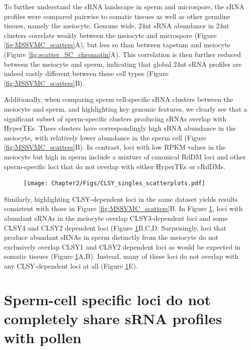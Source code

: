 To further understand the sRNA landscape in sperm and microspore, the sRNA profiles were compared pairwise to somatic tissues as well as other germline tissues, namely the meiocyte. Genome wide, 24nt sRNA abundance in 24nt clusters correlate weakly between the meiocyte and microspore (Figure \ref{fig:MSSVMC_scatters}A), but less so than between tapetum and meiocyte (Figure \ref{fig:scatter_SC_chromatin}A). This correlation is then further reduced between the meiocyte and sperm, indicating that global 24nt sRNA profiles are indeed vastly different between these cell types (Figure \ref{fig:MSSVMC_scatters}B).

Additionally, when comparing sperm cell-specific sRNA clusters between the meiocyte and sperm, and highlighting key genomic features, we clearly see that a significant subset of sperm-specific clusters producing sRNAs overlap with HyperTEs. These clusters have correspondingly high sRNA abundance in the meiocyte, with relatively lower abundance in the sperm cell (Figure \ref{fig:MSSVMC_scatters}B). In contrast, loci with low RPKM values in the meiocyte but high in sperm include a mixture of canonical RdDM loci and other sperm-specific loci that do not overlap with either HyperTEs or cRdDMs.

\begin{figure}[htbp!] 
\centering    
    \texttt{[image: Chapter2/Figs/CLSY\_singles\_scatterplots.pdf]}
\caption{\textbf{}}
\label{fig:clsysingle_scatters}
\captionsetup{font=small}
    \caption*{}
\end{figure}

Similarly, highlighting CLSY-dependent loci in the same dataset  yields results consistent with those in Figure \ref{fig:MSSVMC_scatters}B. In Figure \ref{fig:clsysingle_scatters}, loci with abundant sRNAs in the meiocyte overlap CLSY3-dependent loci and some CLSY4 and CLSY2 dependent loci (Figure \ref{fig:clsysingle_scatters}B,C,D. Surprisingly, loci that produce abundant sRNAs in sperm distinctly from the meiocyte do not exclusively overlap CLSY1 and CLSY2 dependent loci as would be expected in somatic tissues (Figure \ref{fig:clsysingle_scatters}A,B). Instead, many of these loci do not overlap with any CLSY-dependent loci at all (Figure \ref{fig:clsysingle_scatters}E). 

\section{Sperm-cell specific loci do not completely share sRNA profiles with pollen}

